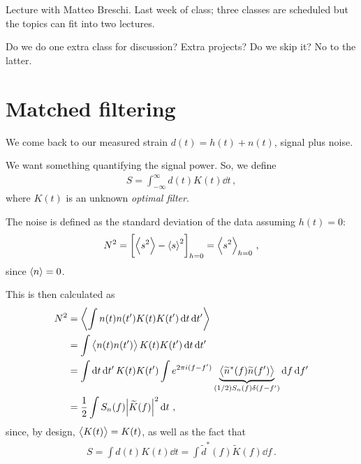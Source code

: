 \documentclass[main.tex]{subfiles}
\begin{document}

Lecture with Matteo Breschi. 
Last week of class; three classes are scheduled but the topics can fit into two lectures. 

Do we do one extra class for discussion? Extra projects? 
Do we skip it? No to the latter. 

\section{Matched filtering}

We come back to our measured strain \(d(t)= h(t) + n(t)\), signal plus noise.

 
We want something quantifying the signal power. 
So, we define 
%
\begin{align}
S = \int_{- \infty }^{\infty } d(t) K(t) \dd{t}
\,,
\end{align}
%
where \(K(t)\) is an unknown \emph{optimal filter}. 

The noise is defined as the standard deviation of the data assuming \(h(t) = 0\):
%
\begin{align}
N^2 = \qty[ \expval{s^2} - \expval{s}^2]_{h = 0} = \expval{s^2}_{h=0}
\,,
\end{align}
%
since \(\expval{n} = 0\). 

This is then calculated as 
%
\begin{align}
N^2 &= \expval{\int n(t) n(t') K(t) K(t') \dd{t} \dd{t'}}  \\
&= \int \expval{n(t) n(t')} K(t) K(t') \dd{t} \dd{t'}  \\
&= \int \dd{t} \dd{t'} K(t) K(t') \int e^{2 \pi i (f - f')} \underbrace{\expval{\widetilde{n}^{*} (f) \widetilde{n}(f')}}_{(1/2) S_n(f) \delta (f- f')} \dd{f} \dd{f'}  \\
&= \frac{1}{2} \int S_n(f) \abs{\widetilde{K}(f)}^2 \dd{t} 
\,,
\end{align}
%
since, by design, \(\expval{K(t)} = K(t)\), as well as the fact that 
%
\begin{align}
S = \int d(t) K(t) \dd{t} = \int \widetilde{d}^{*} (f) \widetilde{K}(f) \dd{f}
\,.
\end{align}
\end{document}
